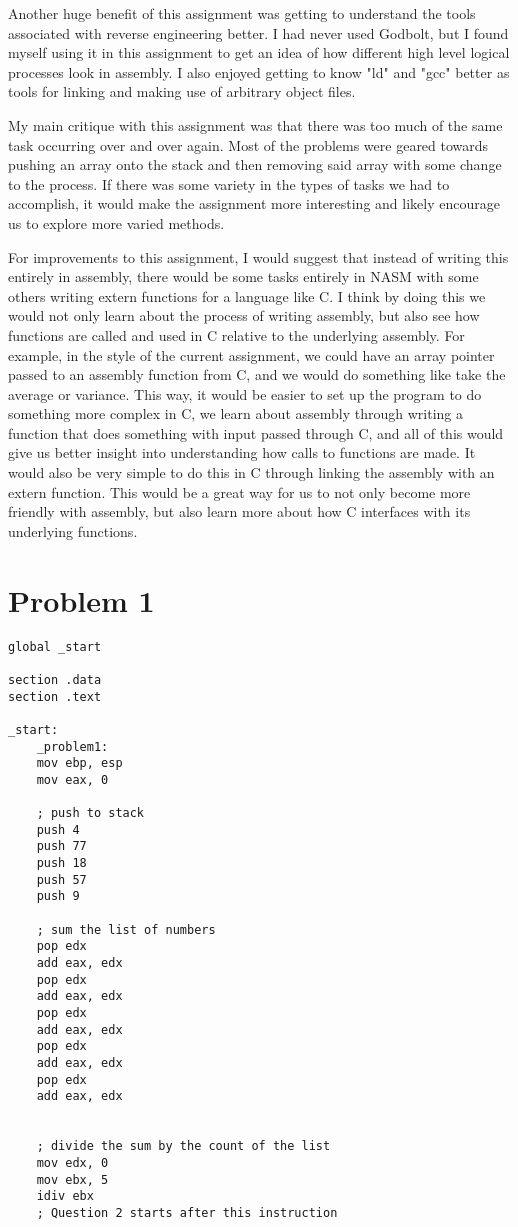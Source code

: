 \documentclass[11pt]{article}
\begin{document}
Another huge benefit of this assignment was getting to understand the tools associated with reverse engineering better. I had never used Godbolt, but I found myself using it in this assignment to get an idea of how different high level logical processes look in assembly. I also enjoyed getting to know "ld" and "gcc" better as tools for linking and making use of arbitrary object files.

My main critique with this assignment was that there was too much of the same task occurring over and over again. Most of the problems were geared towards pushing an array onto the stack and then removing said array with some change to the process. If there was some variety in the types of tasks we had to accomplish, it would make the assignment more interesting and likely encourage us to explore more varied methods.

For improvements to this assignment, I would suggest that instead of writing this entirely in assembly, there would be some tasks entirely in NASM with some others writing extern functions for a language like C. I think by doing this we would not only learn about the process of writing assembly, but also see how functions are called and used in C relative to the underlying assembly. For example, in the style of the current assignment, we could have an array pointer passed to an assembly function from C, and we would do something like take the average or variance. This way, it would be easier to set up the program to do something more complex in C, we learn about assembly through writing a function that does something with input passed through C, and all of this would give us better insight into understanding how calls to functions are made. It would also be very simple to do this in C through linking the assembly with an extern function. This would be a great way for us to not only become more friendly with assembly, but also learn more about how C interfaces with its underlying functions.

\pagebreak

\section*{Problem 1}

\begin{lstlisting}
global _start

section .data
section .text

_start:
    _problem1:
    mov ebp, esp
    mov eax, 0

    ; push to stack
    push 4 
    push 77
    push 18
    push 57
    push 9
    
    ; sum the list of numbers
    pop edx
    add eax, edx
    pop edx
    add eax, edx
    pop edx
    add eax, edx
    pop edx
    add eax, edx
    pop edx
    add eax, edx
    
    
    ; divide the sum by the count of the list
    mov edx, 0
    mov ebx, 5
    idiv ebx
    ; Question 2 starts after this instruction
\end{lstlisting}
\end{document}
